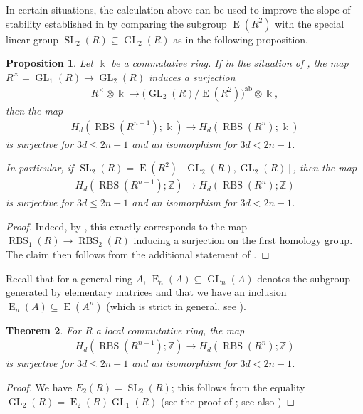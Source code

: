 \documentclass[12pt, reqno]{amsart}
\theoremstyle{plain}
\newtheorem{theorem}{Theorem}[section]
\newtheorem{proposition}[theorem]{Proposition}
\theoremstyle{definition}
\newcommand{\Z}{\mathbb Z}
\begin{document}
In certain situations, the calculation above can be used to improve the slope of stability established in  by comparing the subgroup $\operatorname{E}(R^2)$ with the special linear group $\operatorname{SL}_2(R)\subseteq \operatorname{GL}_2(R)$ as in the following proposition.

\begin{proposition}\label{improve stability to 2/3}
Let $\Bbbk$ be a commutative ring. If in the situation of , the map $R^\times =\operatorname{GL}_1(R)\rightarrow \operatorname{GL}_2(R)$ induces a surjection
\begin{align*}
R^\times\otimes \Bbbk \rightarrow \big(\operatorname{GL}_2(R)/\operatorname{E}(R^2)\big)^{\operatorname{ab}}\otimes \Bbbk,
\end{align*}
then the map
\begin{align*}
H_d(\operatorname{RBS}(R^{n-1}); \Bbbk)\longrightarrow H_d(\operatorname{RBS}(R^n); \Bbbk)
\end{align*}
is surjective for $3d\leq 2n-1$ and an isomorphism for $3d< 2n-1$.

In particular, if $\operatorname{SL}_2(R)=\operatorname{E}(R^2)[\operatorname{GL}_2(R),\operatorname{GL}_2(R)]$, then the map
\begin{align*}
H_d(\operatorname{RBS}(R^{n-1}); \Z)\longrightarrow H_d(\operatorname{RBS}(R^n); \Z)
\end{align*}
is surjective for $3d\leq 2n-1$ and an isomorphism for $3d< 2n-1$.
\end{proposition}
\begin{proof}
Indeed, by , this exactly corresponds to the map $\operatorname{RBS}_1(R)\rightarrow \operatorname{RBS}_2(R)$ inducing a surjection on the first homology group. The claim then follows from the additional statement of \cite[Theorem 18.3]{GalatiusKupersRandalWilliams}.
\end{proof}

Recall that for a general ring $A$, $\operatorname{E}_n(A)\subseteq \operatorname{GL}_n(A)$ denotes the subgroup generated by elementary matrices and that we have an inclusion $\operatorname{E}_n(A)\subseteq \operatorname{E}(A^n)$ (which is strict in general, see \cite[\S 1.1]{ClausenOrsnesJansen}).


\begin{theorem}\label{Euclidean domain 2/3}
For $R$ a local commutative ring, the map
\begin{align*}
H_d(\operatorname{RBS}(R^{n-1}); \Z)\longrightarrow H_d(\operatorname{RBS}(R^n); \Z)
\end{align*}
is surjective for $3d\leq 2n-1$ and an isomorphism for $3d< 2n-1$. 
\end{theorem}
\begin{proof}
We have $E_2(R)=\operatorname{SL}_2(R)$; this follows from the equality $\operatorname{GL}_2(R)=\operatorname{E}_2(R)\operatorname{GL}_1(R)$ (see the proof of \cite[Lemma 1.4, Chapter III]{Weibel99}; see also \cite[Lemma 5.17]{ClausenOrsnesJansen})
\end{proof}
\end{document}
